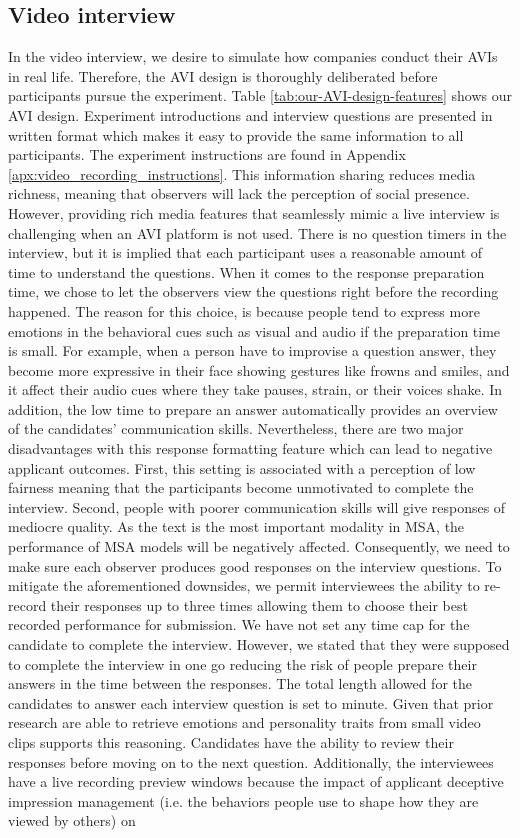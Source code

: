 \subsection{Video interview}
\label{sec:video_interview}
In the video interview, we desire to simulate how companies conduct their AVIs in real life. Therefore, the AVI design is thoroughly deliberated before participants pursue the experiment. Table \ref{tab:our-AVI-design-features} shows our AVI design. Experiment introductions and interview questions are presented in written format which makes it easy to provide the same information to all participants. The experiment instructions are found in Appendix \ref{apx:video_recording_instructions}. This information sharing reduces media richness, meaning that observers will lack the perception of social presence. However, providing rich media features that seamlessly mimic a live interview is challenging when an AVI platform is not used. There is no question timers in the interview, but it is implied that each participant uses a reasonable amount of time to understand the questions. When it comes to the response preparation time, we chose to let the observers view the questions right before the recording happened. The reason for this choice, is because people tend to express more emotions in the behavioral cues such as visual and audio if the preparation time is small. For example, when a person have to improvise a question answer, they become more expressive in their face showing gestures like frowns and smiles, and it affect their audio cues where they take pauses, strain, or their voices shake. In addition, the low time to prepare an answer automatically provides an overview of the candidates' communication skills. Nevertheless, there are two major disadvantages with this response formatting feature which can lead to negative applicant outcomes. First, this setting is associated with a perception of low fairness meaning that the participants become unmotivated to complete the interview. Second, people with poorer communication skills will give responses of mediocre quality. As the text is the most important modality in MSA, the performance of MSA models will be negatively affected. Consequently, we need to make sure each observer produces good responses on the interview questions. To mitigate the aforementioned downsides, we permit interviewees the ability to re-record their responses up to three times allowing them to choose their best recorded performance for submission. We have not set any time cap for the candidate to complete the interview. However, we stated that they were supposed to complete the interview in one go reducing the risk of people prepare their answers in the time between the responses. The total length allowed for the candidates to answer each interview question is set to minute. Given that prior research are able to retrieve emotions and personality traits from small video clips supports this reasoning. Candidates have the ability to review their responses before moving on to the next question. Additionally, the interviewees have a live recording preview windows because the impact of applicant deceptive impression management (i.e. the behaviors people use to shape how they are viewed by others) on 